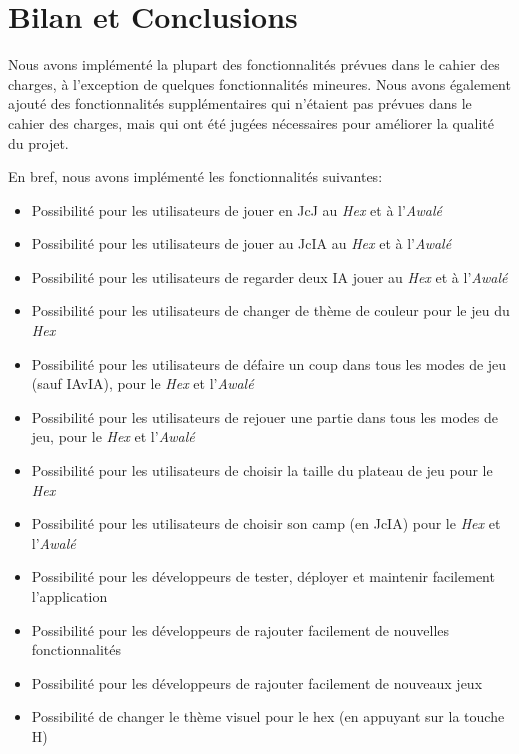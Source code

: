 \section{Bilan et Conclusions}

Nous avons implémenté la plupart des fonctionnalités prévues dans le cahier des charges, à l'exception de quelques
fonctionnalités mineures. Nous avons également ajouté des fonctionnalités supplémentaires qui n'étaient pas prévues
dans le cahier des charges, mais qui ont été jugées nécessaires pour améliorer la qualité du projet.

En bref, nous avons implémenté les fonctionnalités suivantes:

\begin{itemize}
    \item Possibilité pour les utilisateurs de jouer en JcJ au \emph{Hex} et à l'\emph{Awalé}
    \item Possibilité pour les utilisateurs de jouer au JcIA au \emph{Hex} et à l'\emph{Awalé}
    \item Possibilité pour les utilisateurs de regarder deux IA jouer au \emph{Hex} et à l'\emph{Awalé}
    \item Possibilité pour les utilisateurs de changer de thème de couleur pour le jeu du \emph{Hex}
    \item Possibilité pour les utilisateurs de défaire un coup dans tous les modes de jeu (sauf IAvIA), pour le \emph{Hex} et l'\emph{Awalé}
    \item Possibilité pour les utilisateurs de rejouer une partie dans tous les modes de jeu, pour le \emph{Hex} et l'\emph{Awalé}
    \item Possibilité pour les utilisateurs de choisir la taille du plateau de jeu pour le \emph{Hex}
    \item Possibilité pour les utilisateurs de choisir son camp (en JcIA) pour le \emph{Hex} et l'\emph{Awalé}
    \item Possibilité pour les développeurs de tester, déployer et maintenir facilement l'application
    \item Possibilité pour les développeurs de rajouter facilement de nouvelles fonctionnalités
    \item Possibilité pour les développeurs de rajouter facilement de nouveaux jeux
    \item Possibilité de changer le thème visuel pour le hex (en appuyant sur la touche H)
\end{itemize}

